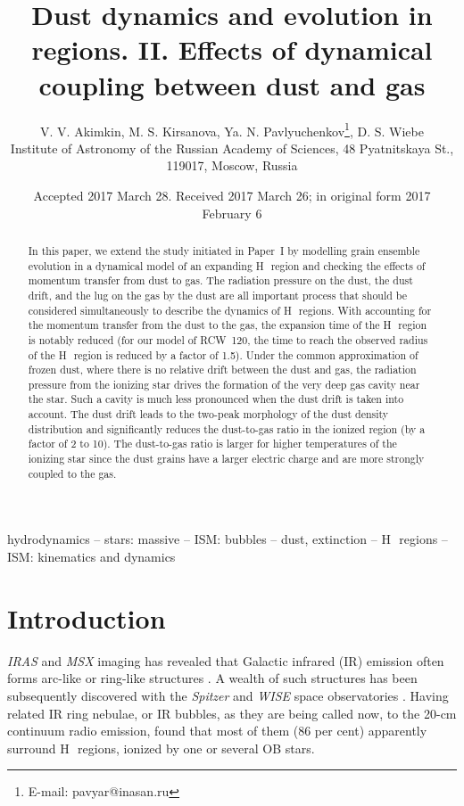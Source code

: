 \documentclass[a4paper,fleqn,usenatbib]{mnras}
\title[Dust dynamics and evolution in \hii regions]
{Dust dynamics and evolution in \hii regions. II. Effects of dynamical coupling between dust and gas}
\author[V. V. Akimkin, M. S. Kirsanova, Ya. N. Pavlyuchenkov, D. S. Wiebe]{
V. V. Akimkin, M. S. Kirsanova, Ya. N. Pavlyuchenkov\thanks{E-mail: pavyar@inasan.ru}, D. S. Wiebe
\\
Institute of Astronomy of the Russian Academy of Sciences, 48 Pyatnitskaya St., 119017, Moscow, Russia}
\date{Accepted 2017 March 28. Received 2017 March 26; in original form 2017 February 6}
\newcommand{\hii}    {H\,{\sc{ii}}~}
\begin{document}
\label{firstpage}
\pagerange{\pageref{firstpage}--\pageref{lastpage}}
\maketitle

\begin{abstract}
In this paper, we extend the study initiated in Paper~I by modelling grain ensemble evolution in a dynamical model of an expanding \hii region and checking the effects of momentum transfer from dust to gas. The radiation pressure on the dust, the dust drift, and the lug on the gas by the dust are all important process that should be considered simultaneously to describe the dynamics of \hii regions. With accounting for the momentum transfer from the dust to the gas, the expansion time of the \hii region is notably reduced (for our model of RCW~120, the time to reach the observed radius of the \hii region is reduced by a factor of 1.5). Under the common approximation of frozen dust, where there is no relative drift between the dust and gas, the radiation pressure from the ionizing star drives the formation of the very deep gas cavity near the star. Such a cavity is much less pronounced when the dust drift is taken into account. The dust drift leads to the two-peak morphology of the dust density distribution and significantly reduces the dust-to-gas ratio in the ionized region (by a factor of 2 to 10). The dust-to-gas ratio is larger for higher temperatures of the ionizing star since the dust grains have a larger electric charge and are more strongly coupled to the gas.
\end{abstract}

\begin{keywords}
hydrodynamics -- stars: massive -- ISM: bubbles -- dust, extinction -- \hii regions -- ISM: kinematics and dynamics
\end{keywords}

\vspace{-0.5cm}
\section{Introduction}

{\it IRAS} and {\it MSX} imaging has revealed that Galactic infrared (IR) emission often forms arc-like or ring-like structures \citep{vanburen,CohenGreen2001}. A wealth of such structures has been subsequently discovered with the {\em Spitzer} and {\it WISE} space observatories \citep{churchwell_06,simpson_12}. Having related IR ring nebulae, or IR bubbles, as they are being called now, to the 20-cm continuum radio emission, \cite{deharveng_10} found that most of them (86 per cent) apparently surround \hii regions, ionized by one or several OB stars.
\end{document}
